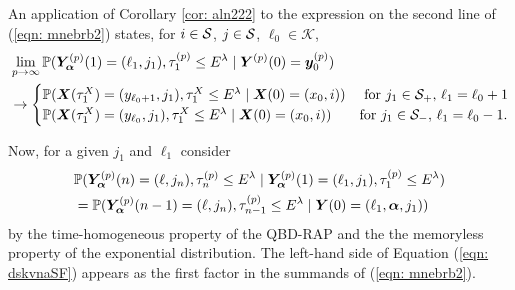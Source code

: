 An application of Corollary \ref{cor: aln222} to the expression on the second line of (\ref{eqn: mnebrb2}) states, for \(i\in\mathcal{S}\), \(j\in\mathcal{S}\), \(\ell_0\in\mathcal K\), 
\begin{align}
	&\lim_{p\to\infty}\mathbb P(\bm{Y}_{\bm{\alpha}}^{(p)}(1)=(\ell_1, j_1), \tau_{1}^{(p)}\leq E^\lambda
	 \mid \boldsymbol Y^{(p)}(0)=\boldsymbol y_0^{(p)}) \nonumber
	 	\\&\to \begin{cases}
			\mathbb P(\boldsymbol X(\tau_1^X) = (y_{\ell_0+1}, j_1), \tau_{1}^X\leq E^\lambda 
            	 \mid \boldsymbol X(0) = (x_0, i)) 
	 &\text{ for }j_1\in\mathcal{S}_+,\, \ell_1=\ell_0+1\\ 
	 	\mathbb P(\boldsymbol X(\tau_1^X) = (y_{\ell_0}, j_1), \tau_{1}^X\leq E^\lambda 
            	 \mid \boldsymbol X(0) = (x_0, i)) & \text{for }j_1\in\mathcal{S}_-,\, \ell_1=\ell_0-1. 
\end{cases}\nonumber 
\end{align}

Now, for a given \(j_1\) and \(\ell_1\) consider 
\begin{align}
	&\mathbb P(\bm{Y}_{\bm{\alpha}}^{(p)}(n) = (\ell, j_n), \tau_{n}^{(p)}\leq E^\lambda 
	 \mid \bm{Y}_{\bm{\alpha}}^{(p)}(1)=(\ell_1, j_1), \tau_1^{(p)}\leq E^\lambda) \nonumber 
	\\&=\mathbb P(\bm{Y}_{\bm{\alpha}}^{(p)}(n-1) = (\ell, j_n), \tau_{n-1}^{(p)}\leq E^\lambda 
	 \mid \boldsymbol Y(0)=(\ell_1,\boldsymbol \alpha, j_1))\label{eqn: dskvnaSF}
\end{align}
by the time-homogeneous property of the QBD-RAP and the the memoryless property of the exponential distribution.
The left-hand side of Equation (\ref{eqn: dskvnaSF}) appears as the first factor in the summands of (\ref{eqn: mnebrb2}). 

